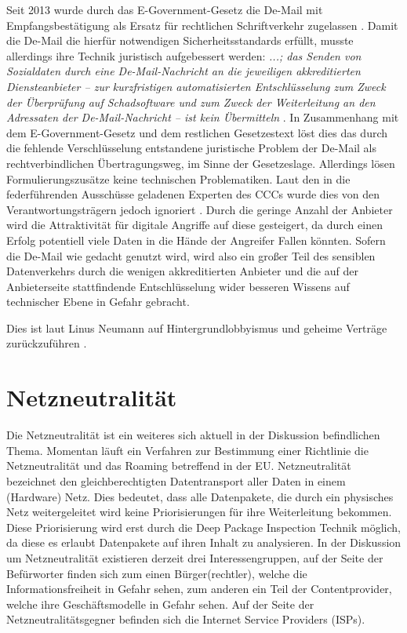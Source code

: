 \documentclass[
	12pt,
	a4paper,
	BCOR10mm,
	DIV14,
	listof=totoc,
	bibliography=totoc,
	headsepline
]{scrreprt}
\begin{document}
Seit 2013 wurde durch das E-Government-Gesetz die De-Mail mit Empfangsbestätigung als Ersatz für rechtlichen Schriftverkehr zugelassen \cite{egov}.
Damit die De-Mail die hierfür notwendigen Sicherheitsstandards erfüllt, musste allerdings ihre Technik juristisch aufgebessert werden:
\textit{ ...; das Senden von Sozialdaten durch eine De-Mail-Nachricht an die jeweiligen akkreditierten Diensteanbieter – zur kurzfristigen automatisierten Entschlüsselung zum Zweck der Überprüfung auf Schadsoftware und zum Zweck der Weiterleitung an den Adressaten der De-Mail-Nachricht – ist kein Übermitteln\grqq} \cite{sozgesb10}.
In Zusammenhang mit dem E-Government-Gesetz und dem restlichen Gesetzestext löst dies das durch die fehlende Verschlüsselung entstandene juristische Problem der De-Mail als rechtverbindlichen Übertragungsweg, im Sinne der Gesetzeslage.
Allerdings lösen Formulierungszusätze keine technischen Problematiken. 
Laut den in die federführenden Ausschüsse geladenen Experten des CCCs wurde dies von den Verantwortungsträgern jedoch ignoriert \cite{bsinger}.
Durch die geringe Anzahl der Anbieter wird die Attraktivität für digitale Angriffe auf diese gesteigert, da durch einen Erfolg potentiell viele Daten in die Hände der Angreifer Fallen könnten.
Sofern die De-Mail wie gedacht genutzt wird, wird also ein großer Teil des sensiblen Datenverkehrs durch die wenigen akkreditierten Anbieter und die auf der Anbieterseite stattfindende Entschlüsselung wider besseren Wissens auf technischer Ebene in Gefahr gebracht.

Dies ist laut Linus Neumann auf Hintergrundlobbyismus und geheime Verträge zurückzuführen \cite{bsinger}.




\section{Netzneutralität}
\label{netneutr}
Die Netzneutralität ist ein weiteres sich aktuell in der Diskussion befindlichen Thema.
Momentan läuft ein Verfahren zur Bestimmung einer Richtlinie die Netzneutralität und das Roaming betreffend in der EU.
Netzneutralität bezeichnet den gleichberechtigten Datentransport aller Daten in einem (Hardware) Netz.
Dies bedeutet, dass alle Datenpakete, die durch ein physisches Netz weitergeleitet wird keine Priorisierungen für ihre Weiterleitung bekommen.
Diese Priorisierung wird erst durch die Deep Package Inspection Technik möglich, da diese es erlaubt Datenpakete auf ihren Inhalt zu analysieren.
In der Diskussion um Netzneutralität existieren derzeit drei Interessengruppen, auf der Seite der Befürworter finden sich zum einen Bürger(rechtler), welche die Informationsfreiheit in Gefahr sehen, zum anderen ein Teil der Contentprovider, welche ihre Geschäftsmodelle in Gefahr sehen.
Auf der Seite der Netzneutralitätsgegner befinden sich die Internet Service Providers (ISPs).
\end{document}

